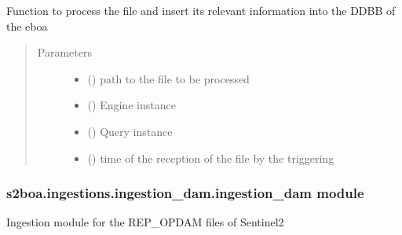 \begin{fulllineitems}
\label{\detokenize{s2boa.ingestions:s2boa.ingestions.ingestion_ai.ingestion_ai.process_file}}
\sphinxAtStartPar
Function to process the file and insert its relevant information
into the DDBB of the eboa
\begin{quote}\begin{description}
\item[{Parameters}] \leavevmode\begin{itemize}
\item {} 
\sphinxAtStartPar
{} () \textendash{} path to the file to be processed

\item {} 
\sphinxAtStartPar
{} () \textendash{} Engine instance

\item {} 
\sphinxAtStartPar
{} () \textendash{} Query instance

\item {} 
\sphinxAtStartPar
{} () \textendash{} time of the reception of the file by the triggering

\end{itemize}

\end{description}\end{quote}

\end{fulllineitems}



\subsubsection{s2boa.ingestions.ingestion\_dam.ingestion\_dam module}
\label{\detokenize{s2boa.ingestions:module-s2boa.ingestions.ingestion_dam.ingestion_dam}}\label{\detokenize{s2boa.ingestions:s2boa-ingestions-ingestion-dam-ingestion-dam-module}}
\sphinxAtStartPar
Ingestion module for the REP\_OPDAM files of Sentinel\sphinxhyphen{}2

